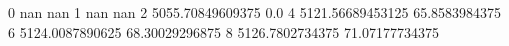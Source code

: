 0 nan nan
1 nan nan
2 5055.70849609375 0.0
4 5121.56689453125 65.8583984375
6 5124.0087890625 68.30029296875
8 5126.7802734375 71.07177734375
